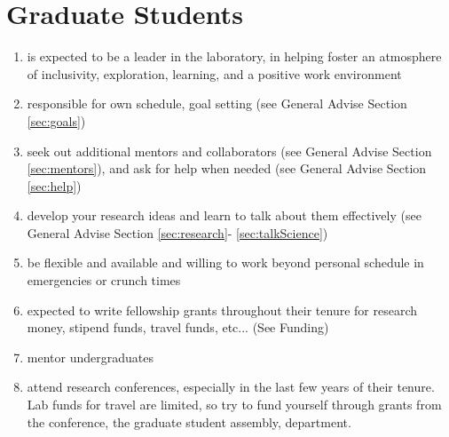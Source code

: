 \documentclass[12pt]{article}
\begin{document}
\section{Graduate Students}
\begin{enumerate}
\item is expected to be a leader in the laboratory, in helping foster
  an atmosphere of inclusivity, exploration, learning, and a positive
  work environment
\item responsible for own schedule, goal setting (see General Advise
  Section \ref{sec:goals})
\item seek out additional mentors and collaborators (see General
  Advise Section \ref{sec:mentors}), and ask for help when needed (see
  General Advise Section \ref{sec:help})
\item develop your research ideas and learn to talk about them
  effectively (see General Advise Section \ref{sec:research}-
  \ref{sec:talkScience})
\item be flexible and available and willing to work beyond personal
  schedule in emergencies or crunch times
\item expected to write fellowship grants throughout their tenure for
  research money, stipend funds, travel funds, etc... (See Funding)
\item mentor undergraduates
\item attend research conferences, especially in the last few years of
  their tenure. Lab funds for travel are limited, so try to fund
  yourself through grants from the conference, the graduate student
  assembly, department.
\end{enumerate}
\end{document}
